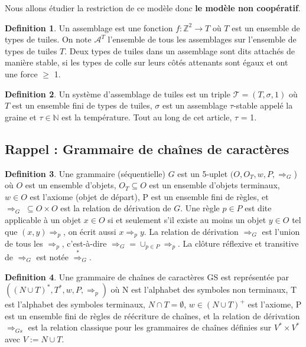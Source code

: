 \documentclass[12pt]{article}
\theoremstyle{definition}
\newtheorem{definition}{Definition}
\begin{document}
	Nous allons étudier la restriction de ce modèle donc \textbf{le modèle non coopératif}.\\
	
	\begin{definition}
		Un assemblage est une fonction $ f : \mathbb{Z}^{2 } \rightarrow T $  où $T$ est un ensemble de types de tuiles. On note $\mathcal{A}^{T}$ l'ensemble de tous les assemblages sur l'ensemble de types de tuiles $T$. Deux types de tuiles dans un assemblage sont dits attachés de manière stable, si les types de colle sur leurs côtés attenants sont égaux et ont une force $\geq$ 1.\\
	\end{definition}
	
	\begin{definition}
		Un système d'assemblage de tuiles est un triple $\mathcal{T}=(T,\sigma,1)$ où $T$ est un ensemble fini de types de tuiles, $\sigma$ est un assemblage $\tau$-stable appelé la graine et $\tau \in \mathbb{N}$ est la température. Tout au long de cet article, $\tau$ = 1. \\
	\end{definition}
	
	
	
	
	\subsection{Rappel : Grammaire de chaînes de caractères }
	\begin{definition}
		Une grammaire (séquentielle) $G$ est un 5-uplet $(O, O_{T} , w, P, \Longrightarrow_{G}$) où $O$ est un ensemble d'objets, $O_{T} \subseteq O$ est un ensemble d'objets terminaux, $\mathit{w} \in O$ est l'axiome (objet de départ), P est un ensemble fini de règles, et $\Longrightarrow_{G} \; \subseteq O \times O $ est la relation de dérivation de $G$.
		Une règle $p \in P$  est dite applicable à un objet $x \in O$ si et seulement s'il existe au moins un objet $y \in O$ tel que $(x,y)\Longrightarrow_{p}$, on écrit aussi $x\Longrightarrow_{p} y$.
		La relation de dérivation $\Longrightarrow_{G}$ est l'union de tous les $\Longrightarrow_{p}$, c'est-à-dire $\Longrightarrow_{G} = \cup_{p \in P} \Longrightarrow_{p}$. La clôture réflexive et transitive de $\Longrightarrow_{G}$ est notée  $\overset{*}\Longrightarrow_{G}$. \\
	\end{definition}
	
	\begin{definition}
		Une grammaire de chaînes de caractères GS est représentée par ${((N \cup T)^{*} , T^{*}, w, P,\Longrightarrow_{p} )}$ où N est l'alphabet des symboles non terminaux, T est l'alphabet des symboles terminaux, $N \cap T = \emptyset $,  $ w \in (N \cup T)^{+}$ est l'axiome, P est un ensemble fini de règles de réécriture de chaînes, et la relation de dérivation $\Longrightarrow_{Gs}$ est la relation classique pour les grammaires de chaînes définies sur $V^{*} \times V^{*}$ avec $ V := N \cup T$.\\
	\end{definition}
	
\end{document}
